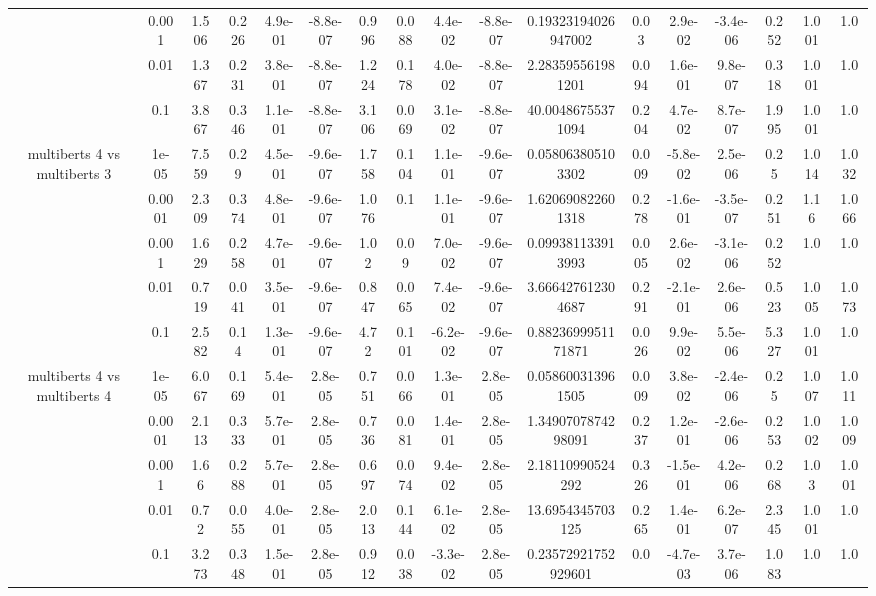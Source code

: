 \begin{tabular}{|c|c|c|c|c|c|c|c|c|c|c|c|c|c|c|c|c|}
 & 0.001 & 1.506 & 0.226 & 4.9e-01 & -8.8e-07 & 0.996 & 0.088 & 4.4e-02 & -8.8e-07 & 0.19323194026947002 & 0.03 & 2.9e-02 & -3.4e-06 & 0.252 & 1.001 & 1.0 \\
 & 0.01 & 1.367 & 0.231 & 3.8e-01 & -8.8e-07 & 1.224 & 0.178 & 4.0e-02 & -8.8e-07 & 2.283595561981201 & 0.094 & 1.6e-01 & 9.8e-07 & 0.318 & 1.001 & 1.0 \\
 & 0.1 & 3.867 & 0.346 & 1.1e-01 & -8.8e-07 & 3.106 & 0.069 & 3.1e-02 & -8.8e-07 & 40.00486755371094 & 0.204 & 4.7e-02 & 8.7e-07 & 1.995 & 1.001 & 1.0 \\
\hline
\multirow{5}{*}{multiberts 4 vs multiberts 3} & 1e-05 & 7.559 & 0.29 & 4.5e-01 & -9.6e-07 & 1.758 & 0.104 & 1.1e-01 & -9.6e-07 & 0.058063805103302 & 0.009 & -5.8e-02 & 2.5e-06 & 0.25 & 1.014 & 1.032 \\
 & 0.0001 & 2.309 & 0.374 & 4.8e-01 & -9.6e-07 & 1.076 & 0.1 & 1.1e-01 & -9.6e-07 & 1.620690822601318 & 0.278 & -1.6e-01 & -3.5e-07 & 0.251 & 1.16 & 1.066 \\
 & 0.001 & 1.629 & 0.258 & 4.7e-01 & -9.6e-07 & 1.02 & 0.09 & 7.0e-02 & -9.6e-07 & 0.099381133913993 & 0.005 & 2.6e-02 & -3.1e-06 & 0.252 & 1.0 & 1.0 \\
 & 0.01 & 0.719 & 0.041 & 3.5e-01 & -9.6e-07 & 0.847 & 0.065 & 7.4e-02 & -9.6e-07 & 3.666427612304687 & 0.291 & -2.1e-01 & 2.6e-06 & 0.523 & 1.005 & 1.073 \\
 & 0.1 & 2.582 & 0.14 & 1.3e-01 & -9.6e-07 & 4.72 & 0.101 & -6.2e-02 & -9.6e-07 & 0.8823699951171871 & 0.026 & 9.9e-02 & 5.5e-06 & 5.327 & 1.001 & 1.0 \\
\hline
\multirow{5}{*}{multiberts 4 vs multiberts 4} & 1e-05 & 6.067 & 0.169 & 5.4e-01 & 2.8e-05 & 0.751 & 0.066 & 1.3e-01 & 2.8e-05 & 0.058600313961505 & 0.009 & 3.8e-02 & -2.4e-06 & 0.25 & 1.007 & 1.011 \\
 & 0.0001 & 2.113 & 0.333 & 5.7e-01 & 2.8e-05 & 0.736 & 0.081 & 1.4e-01 & 2.8e-05 & 1.3490707874298091 & 0.237 & 1.2e-01 & -2.6e-06 & 0.253 & 1.002 & 1.009 \\
 & 0.001 & 1.66 & 0.288 & 5.7e-01 & 2.8e-05 & 0.697 & 0.074 & 9.4e-02 & 2.8e-05 & 2.18110990524292 & 0.326 & -1.5e-01 & 4.2e-06 & 0.268 & 1.03 & 1.001 \\
 & 0.01 & 0.72 & 0.055 & 4.0e-01 & 2.8e-05 & 2.013 & 0.144 & 6.1e-02 & 2.8e-05 & 13.6954345703125 & 0.265 & 1.4e-01 & 6.2e-07 & 2.345 & 1.001 & 1.0 \\
 & 0.1 & 3.273 & 0.348 & 1.5e-01 & 2.8e-05 & 0.912 & 0.038 & -3.3e-02 & 2.8e-05 & 0.23572921752929601 & 0.0 & -4.7e-03 & 3.7e-06 & 1.083 & 1.0 & 1.0 \\

\end{tabular}
